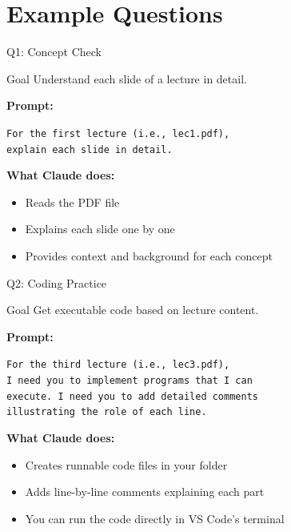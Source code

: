 \documentclass[aspectratio=169,xcolor=dvipsnames]{beamer}
\begin{document}
\section{Example Questions}

\begin{frame}{Q1: Concept Check}
  \begin{block}{Goal}
    Understand each slide of a lecture in detail.
  \end{block}

  \vspace{0.5em}
  \textbf{Prompt:}
  \begin{center}
    \colorbox{codebg}{%
      \parbox{0.75\textwidth}{%
        \texttt{\textcolor{codetext}{For the first lecture (i.e., lec1.pdf),}}\\
        \texttt{\textcolor{codetext}{explain each slide in detail.}}
      }%
    }
  \end{center}

  \vspace{1em}
  \textbf{What Claude does:}
  \begin{itemize}
    \item Reads the PDF file
    \item Explains each slide one by one
    \item Provides context and background for each concept
  \end{itemize}
\end{frame}

\begin{frame}{Q2: Coding Practice}
  \begin{block}{Goal}
    Get executable code based on lecture content.
  \end{block}

  \vspace{0.5em}
  \textbf{Prompt:}
  \begin{center}
    \colorbox{codebg}{%
      \parbox{0.75\textwidth}{%
        \texttt{\textcolor{codetext}{For the third lecture (i.e., lec3.pdf),}}\\
        \texttt{\textcolor{codetext}{I need you to implement programs that I can}}\\
        \texttt{\textcolor{codetext}{execute. I need you to add detailed comments}}\\
        \texttt{\textcolor{codetext}{illustrating the role of each line.}}
      }%
    }
  \end{center}

  \vspace{1em}
  \textbf{What Claude does:}
  \begin{itemize}
    \item Creates runnable code files in your folder
    \item Adds line-by-line comments explaining each part
    \item You can run the code directly in VS Code's terminal
  \end{itemize}
\end{frame}
\end{document}
